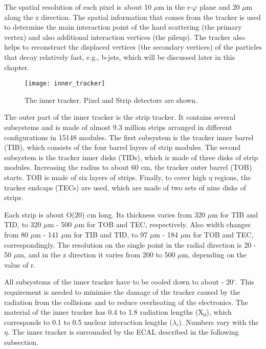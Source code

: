 \begin{normalsize}
The spatial resolution of each pixel is about 10 $\mu$m in the r-$\varphi$ plane and 20 $\mu$m along the z direction. The spatial information that comes from the tracker is used to determine the main interaction point of the hard scattering (the primary vertex) and also additional interaction vertices (the pileup). The tracker also helps to reconstruct the displaced vertices (the secondary vertices) of the particles that decay relatively fast, e.g., b-jets, which will be discussed later in this chapter. 




\begin{figure}[h!]
  \centering
  \texttt{[image: inner\_tracker]}
  \caption[The inner tracker]{The inner tracker. Pixel and Strip detectors are shown. }
  \label{inner_tracker}
\end{figure}


The outer part of the inner tracker is the strip tracker. It contains several subsystems and is made of almost 9.3 million strips arranged in different configurations in 15148 modules. The first subsystem is the tracker inner barrel (TIB), which consists of the four barrel layers of strip modules. The second subsystem is the tracker inner disks (TIDs), which is made of three disks of strip modules. Increasing the radius to about 60 cm, the tracker outer barrel (TOB) starts. TOB is made of six layers of strips. Finally, to cover high $\eta$ regions, the tracker endcaps (TECs) are used, which are made of two sets of nine disks of strips. 

Each strip is about O(20) cm long. Its thickness varies from 320 $\mu$m  for TIB and TID, to 320 $\mu$m - 500 $\mu$m  for TOB and TEC, respectively. Also width changes from 80 $\mu$m - 141 $\mu$m for TIB and TID, to 97 $\mu$m - 184 $\mu$m  for TOB and TEC, correspondingly. The resolution on the single point in the radial direction is 20 - 50 $\mu$m, and in the z direction it varies from 200 to 500 $\mu$m, depending on the value of r. 

All subsystems of the inner tracker have to be cooled down to about - 20$^{\circ}$.  This requirement is needed to minimise the damage of the tracker caused by the radiation from the collisions and to reduce overheating of the electronics. The material of the inner tracker has 0.4 to 1.8 radiation lengths (X$_0$), which corresponds to 0.1 to 0.5 nuclear interaction lengths ($\lambda_i $). Numbers vary with the $\eta$. The inner tracker is surrounded by the ECAL described in the following subsection.





\end{normalsize}
